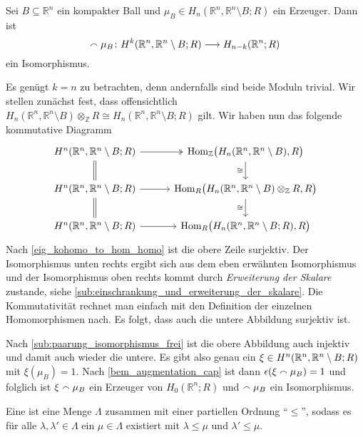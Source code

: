 \begin{lemma}[{name=[Isomorphismus von Kohomologie und Homologie für kompakte Bälle]},label=Rn_kompakteBaelle]
	Sei $B \subseteq \mathbb{R}^n$ ein kompakter Ball und $\mu_B \in H_n(\mathbb{R}^n,\mathbb{R}^n \setminus B;R)$ ein Erzeuger. Dann ist 
	\[
		\capp \mu_B \colon H^k \enbrace*{\mathbb{R}^n,\mathbb{R}^n \setminus B;R} \longrightarrow H_{n-k}(\mathbb{R}^n;R)
	\]
	ein Isomorphismus.
\end{lemma}
\begin{beweis}
	Es genügt $k=n$ zu betrachten, denn andernfalls sind beide Moduln trivial. 
	Wir stellen zunächst fest, dass offensichtlich $H_n(\mathbb{R}^n,\mathbb{R}^n\setminus B) \otimes_\mathbb{Z} R \cong H_n(\mathbb{R}^n,\mathbb{R}^n\setminus B;R)$ gilt.
	Wir haben nun das folgende kommutative Diagramm
	\[
		\begin{tikzcd}[column sep=3em]
			H^n(\mathbb{R}^n,\mathbb{R}^n\setminus B;R) \dar[equal] \rar[two heads] & \Hom_\mathbb{Z} \enbrace[\big]{H_n(\mathbb{R}^n,\mathbb{R}^n\setminus B),R} \dar["\cong"'] \\
			H^n(\mathbb{R}^n,\mathbb{R}^n\setminus B;R) \dar[equal] \rar & \Hom_R \enbrace[\big]{H_n(\mathbb{R}^n,\mathbb{R}^n\setminus B) \otimes_\mathbb{Z} R,R} \dar["\cong"']\\
			H^n(\mathbb{R}^n,\mathbb{R}^n\setminus B;R) \rar & \Hom_R \enbrace[\big]{H_n(\mathbb{R}^n,\mathbb{R}^n\setminus B;R),R}
		\end{tikzcd}
	\]
	Nach \autoref{eig_kohomo_to_hom_homo} ist die obere Zeile surjektiv.
	Der Isomorphismus unten rechts ergibt sich aus dem eben erwähnten Isomorphismus und der Isomorphismus oben rechts kommt durch \emph{Erweiterung der Skalare} zustande, siehe \cref{sub:einschrankung_und_erweiterung_der_skalare}.
	Die Kommutativität rechnet man einfach mit den Definition der einzelnen Homomorphismen nach.
	Es folgt, dass auch die untere Abbildung surjektiv ist.
	
	Nach \cref{sub:paarung_isomorphismus_frei} ist die obere Abbildung auch injektiv und damit auch wieder die untere.
	Es gibt also genau ein $\xi \in H^n \enbrace*{\mathbb{R}^n,\mathbb{R}^n \setminus B;R}$ mit $\xi(\mu_B)=1$. 
	Nach \autoref{bem_augmentation_cap} ist dann $\epsilon(\xi \smallfrown \mu_B)=1$ und
	folglich ist $\xi \smallfrown \mu_B$ ein Erzeuger von $H_0(\mathbb{R}^n;R)$ und $\smallfrown \mu_B$ ein Isomorphismus.
\end{beweis}

\begin{definition}[{name=[gerichtete Menge]}]
	Eine  ist eine Menge $\Lambda$ zusammen mit einer partiellen Ordnung \enquote{$\le$}, sodass es für alle $\lambda,\lambda' \in \Lambda$ ein $\mu \in \Lambda$ existiert mit $\lambda \le \mu $ und $\lambda' \le \mu$.
\end{definition}

